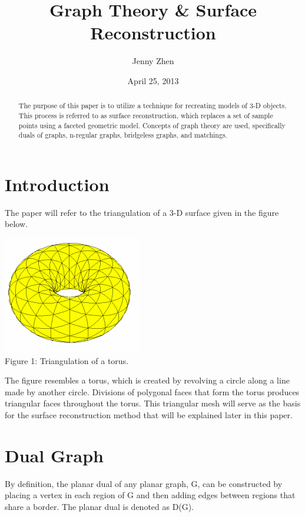 \documentclass[12pt]{article}
\begin{document}
\title{Graph Theory \& Surface Reconstruction}
\author{Jenny Zhen}
\date{April 25, 2013}
\maketitle

\begin{abstract}The purpose of this paper is to utilize a technique for recreating models of 3-D objects. This process is referred to as surface reconstruction, which replaces a set of sample points using a faceted geometric model. Concepts of graph theory are used, specifically duals of graphs, n-regular graphs, bridgeless graphs, and matchings.
\end{abstract}

\begin{flushleft}
\section*{Introduction}
The paper will refer to the triangulation of a 3-D surface given in the figure below.

\begin{center}
\includegraphics[scale=1]{images/torus.png}\\
Figure 1: Triangulation of a torus.
\end{center}

The figure resembles a torus, which is created by revolving a circle along a line made by another circle. Divisions of polygonal faces that form the torus produces triangular faces throughout the torus. This triangular mesh will serve as the basis for the surface reconstruction method that will be explained later in this paper.

\section*{Dual Graph}
By definition, the planar dual of any planar graph, G, can be constructed by placing a vertex in each region of G and then adding edges between regions that share a border. The planar dual is denoted as D(G).


\end{flushleft}
\end{document}
